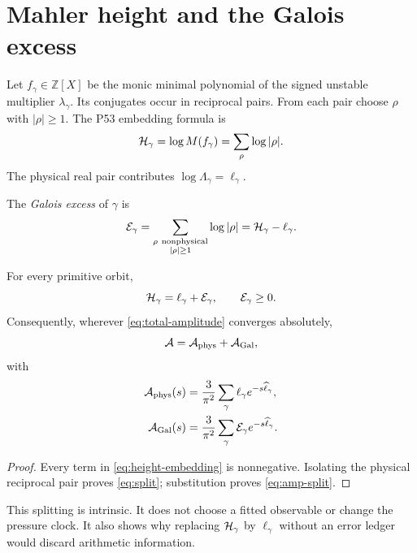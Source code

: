 \section{Mahler height and the Galois excess}

Let \(f_\gamma\in\mathbb Z[X]\) be the monic minimal polynomial of the
signed unstable multiplier \(\lambda_\gamma\).  Its conjugates occur in
reciprocal pairs.  From each pair choose \(\rho\) with \(|\rho|\ge1\).
The P53 embedding formula is
\begin{equation}
\mathcal H_\gamma=\log M(f_\gamma)
=\sum_{\rho}\log|\rho|.
\label{eq:height-embedding}
\end{equation}
The physical real pair contributes \(\log\Lambda_\gamma=\ell_\gamma\).

\begin{definition}
The \emph{Galois excess} of \(\gamma\) is
\begin{equation}
\mathcal E_\gamma
=\sum_{\substack{\rho\ \mathrm{nonphysical}\\|\rho|\ge1}}
\log|\rho|
=\mathcal H_\gamma-\ell_\gamma.
\label{eq:excess}
\end{equation}
\end{definition}

\begin{proposition}
For every primitive orbit,
\begin{equation}
\mathcal H_\gamma=\ell_\gamma+\mathcal E_\gamma,
\qquad \mathcal E_\gamma\ge0.
\label{eq:split}
\end{equation}
Consequently, wherever \eqref{eq:total-amplitude} converges absolutely,
\begin{equation}
\mathcal A=\mathcal A_{\rm phys}+\mathcal A_{\rm Gal},
\label{eq:amp-split}
\end{equation}
with
\begin{align}
\mathcal A_{\rm phys}(s)
&=\frac3{\pi^2}\sum_\gamma
\ell_\gamma e^{-s\widehat\ell_\gamma},
\label{eq:physical}\\
\mathcal A_{\rm Gal}(s)
&=\frac3{\pi^2}\sum_\gamma
\mathcal E_\gamma e^{-s\widehat\ell_\gamma}.
\label{eq:galois}
\end{align}
\end{proposition}

\begin{proof}
Every term in \eqref{eq:height-embedding} is nonnegative.  Isolating the
physical reciprocal pair proves \eqref{eq:split}; substitution proves
\eqref{eq:amp-split}.
\end{proof}

This splitting is intrinsic.  It does not choose a fitted observable or
change the pressure clock.  It also shows why replacing
\(\mathcal H_\gamma\) by \(\ell_\gamma\) without an error ledger would discard
arithmetic information.
